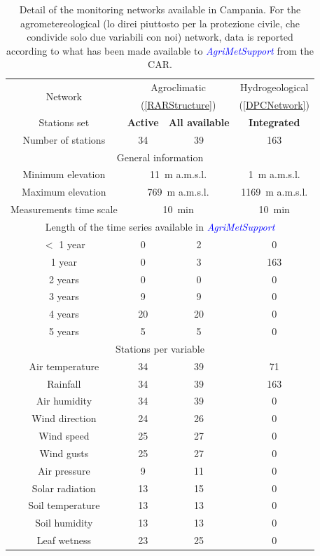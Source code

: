 \documentclass[authoryear,preprint,review,12pt]{elsarticle}
\newcommand{\update}[1]{\emph{\textcolor{blue}{#1}}}
\newcommand{\gci}{\update{AgriMetSupport}\xspace}
\begin{document}
\begin{table}[]
    \centering
    \begin{tabular}{c|c|c|c}
        \multirow{2}{*}{Network} & \multicolumn{2}{c|}{\footnotesize{Agroclimatic}} & \footnotesize{Hydrogeological} \\
        & \multicolumn{2}{c|}{\footnotesize{(\cref{RARStructure})}} & \footnotesize{(\cref{DPCNetwork})} \\
        Stations set & \textbf{\scriptsize{Active}} & \textbf{\scriptsize{All available}} & \textbf{\scriptsize{Integrated}} \\ 
        \hline
        Number of stations & 34 & 39 & 163\\
        \hline
        \multicolumn{4}{c}{General information} \\
        \hline
        Minimum elevation & \multicolumn{2}{c}{\SI{11}{\metre} a.m.s.l.} & \SI{1}{\metre} a.m.s.l. \\
        Maximum elevation & \multicolumn{2}{c}{\SI{769}{\metre} a.m.s.l.} & \SI{1169}{\metre} a.m.s.l.\\
        Measurements time scale & \multicolumn{2}{c}{\SI{10}{\minute}} & \SI{10}{\minute} \\
        \hline
        \multicolumn{4}{c}{Length of the time series available in \gci} \\
        \hline
        $<$ 1 year & 0 & 2 & 0 \\
        1 year & 0 & 3 & 163\\
        2 years & 0 & 0 & 0 \\
        3 years & 9 & 9 & 0\\
        4 years & 20 & 20 & 0\\
        5 years & 5 & 5 & 0\\
        \hline
        \multicolumn{4}{c}{Stations per variable} \\
        \hline
        Air temperature & 34 & 39 & 71\\
        Rainfall & 34 & 39 & 163\\
        Air humidity & 34 & 39 & 0\\
        Wind direction & 24 & 26 & 0\\
        Wind speed & 25 & 27 & 0\\
        Wind gusts & 25 & 27 & 0\\
        Air pressure & 9 & 11 & 0\\
        Solar radiation & 13 & 15 & 0\\
        Soil temperature & 13 & 13 & 0\\
        Soil humidity & 13 & 13 & 0\\
        Leaf wetness & 23 & 25 & 0 
    \end{tabular}
    \caption{Detail of the monitoring networks available  in Campania. For the agrometereological (lo direi piuttosto per la protezione civile, che condivide solo due variabili con noi) network, data is reported according to what has been made available to \gci from the CAR.}
    \label{tab:rarSummary}
\end{table}
\end{document}
